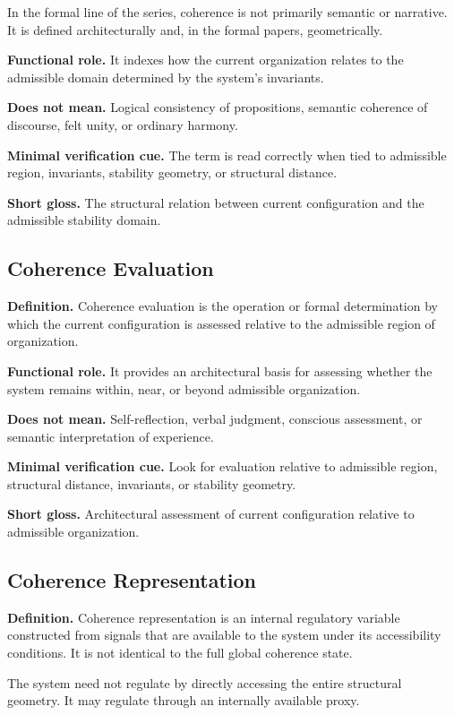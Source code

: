 \documentclass[11pt,a4paper]{article}
\begin{document}
	In the formal line of the series, coherence is not primarily semantic or narrative. It is defined architecturally and, in the formal papers, geometrically.
	
	\textbf{Functional role.} It indexes how the current organization relates to the admissible domain determined by the system's invariants.
	
	\textbf{Does not mean.} Logical consistency of propositions, semantic coherence of discourse, felt unity, or ordinary harmony.
	
	\textbf{Minimal verification cue.} The term is read correctly when tied to admissible region, invariants, stability geometry, or structural distance.
	
	\textbf{Short gloss.} The structural relation between current configuration and the admissible stability domain.
	
	\subsection{Coherence Evaluation}
	
	\textbf{Definition.} Coherence evaluation is the operation or formal determination by which the current configuration is assessed relative to the admissible region of organization.
	
	\textbf{Functional role.} It provides an architectural basis for assessing whether the system remains within, near, or beyond admissible organization.
	
	\textbf{Does not mean.} Self-reflection, verbal judgment, conscious assessment, or semantic interpretation of experience.
	
	\textbf{Minimal verification cue.} Look for evaluation relative to admissible region, structural distance, invariants, or stability geometry.
	
	\textbf{Short gloss.} Architectural assessment of current configuration relative to admissible organization.
	
	\subsection{Coherence Representation}
	
	\textbf{Definition.} Coherence representation is an internal regulatory variable constructed from signals that are available to the system under its accessibility conditions. It is not identical to the full global coherence state.
	
	The system need not regulate by directly accessing the entire structural geometry. It may regulate through an internally available proxy.
	
\end{document}
